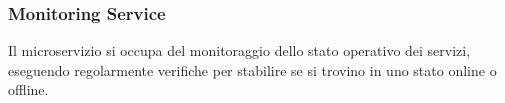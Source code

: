 

%
%
%
\subsubsection{Monitoring Service}

Il microservizio si occupa del monitoraggio dello stato operativo dei servizi, eseguendo regolarmente verifiche per stabilire se si trovino in uno stato online o offline.
%

